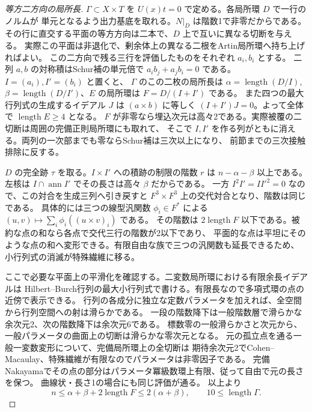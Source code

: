 \begin{proof}[等方二方向の局所長]
$\Gamma\subset X\times T$ を $U(x)t=0$ で定める。各局所環 $D$ で一行のノルムが
単元となるよう出力基底を取れる。$N|_D$ は階数1で非零だからである。
その行に直交する平面の等方方向は二本で、$D$ 上で互いに異なる切断を与える。
実際この平面は非退化で、剰余体上の異なる二根をArtin局所環へ持ち上げればよい。
この二方向で残る三行を評価したものをそれぞれ $a_i,b_i$ とする。
二列 $a,b$ の対称積はSchur補の単元倍で
$a_i b_j+a_j b_i=0$ である。$I=(a_i),I'=(b_i)$ と置くと、
$\Gamma$ のこの二枚の局所長は $\alpha=\operatorname{length}(D/I)$,
$\beta=\operatorname{length}(D/I')$、$E$ の局所環は $F=D/(I+I')$ である。
また四つの最大行列式の生成するイデアル $J$ は $(a\times b)$ に等しく
$(I+I')J=0$。よって全体で $\operatorname{length}E\ge4$ となる。
$F$ が非零なら埋込次元は高々2である。実際被覆の二切断は周囲の完備正則局所環にも取れて、
そこで $I,I'$ を作る列がともに消える。両列の一次部までも零ならSchur補は三次以上になり、
前節までの三次接触排除に反する。

$D$ の完全跡 $\tau$ を取る。$I\times I'$ への積跡の制限の階数 $r$ は
$n-\alpha-\beta$ 以上である。左核は $I\cap\operatorname{ann} I'$ でその長さは高々 $\beta$ だからである。
一方 $I^2 I'=I I'^2=0$ なので、この対合を生成三列へ引き戻すと
$F^3\times F^3$ 上の交代対合となり、階数は同じである。
具体的には三つの線型汎関数 $\phi_i\in F^*$ による
$(u,v)\mapsto\sum_i\phi_i((u\times v)_i)$ である。
その階数は $2\operatorname{length}F$ 以下である。被約な点の和なら各点で交代三行の階数が2以下であり、
平面的な点は平坦にそのような点の和へ変形できる。有限自由な族で三つの汎関数も延長できるため、
小行列式の消滅が特殊繊維に移る。

ここで必要な平面上の平滑化を確認する。二変数局所環における有限余長イデアルは
Hilbert--Burch行列の最大小行列式で書ける。有限長なので多項式環の点の近傍で表示できる。
行列の各成分に独立な定数パラメータを加えれば、全空間から行列空間への射は滑らかである。
一段の階数降下は一般階数層で滑らかな余次元2、次の階数降下は余次元6である。
標数零の一般滑らかさと次元から、一般パラメータの曲面上の切断は滑らかな零次元となる。
元の孤立点を通る一般一変数変形について、完備局所環上の全切断は
期待余次元2でCohen--Macaulay、特殊繊維が有限なのでパラメータは非零因子である。
完備Nakayamaでその点の部分はパラメータ冪級数環上有限、従って自由で元の長さを保つ。
曲線状・長さ1の場合にも同じ評価が通る。
以上より
\[
 n\le \alpha+\beta+2\operatorname{length}F\le2(\alpha+\beta),
 \qquad 10\le\operatorname{length}\Gamma .
\]
\end{proof}

